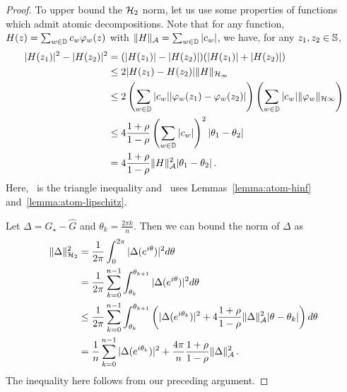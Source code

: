 \begin{proof}
To upper bound the $\mathcal{H}_2$ norm, let us use some properties of functions which admit atomic decompositions.  Note that for any function, $H(z) = \sum_{w \in \mathbb{D}} c_w \varphi_w(z)$ with $\|H\|_{\mathcal{A}}=\sum_{w\in\mathbb{D}} |c_w|$, we have, for any $z_1,z_2\in\mathbb{S}$,
\begin{subequations}
\begin{align}
\nonumber	|H(z_1)|^2-|H(z_2)|^2 &= 
	(|H(z_1)|-|H(z_2)|)(|H(z_1)|+|H(z_2)|) \\
\nonumber	&\leq 2 |H(z_1)-H(z_2)| \|H\|_{\mathcal{H}_{\infty}} \\
\label{eq:tri-ineq2}	&\leq 2 \left( \sum_{w \in \mathbb{D}} |c_w| |\varphi_w(z_1)-\varphi_w(z_2)|\right) \left(\sum_{w\in \mathbb{D}} |c_w| \|\varphi_w\|_{\mathcal{H}{\infty}}\right)\\
\label{eq:applylemmas}	&\leq 4 \frac{1+\rho}{1-\rho}  \left( \sum_{w \in \mathbb{D}} |c_w|\right)^2 |\theta_1-\theta_2|\\
\nonumber	 &= 4 \frac{1+\rho}{1-\rho}  \|H\|_{\mathcal{A}}^2 |\theta_1-\theta_2|\,.
\end{align}
\end{subequations}
Here,~ is the triangle inequality and~ uses Lemmas~\ref{lemma:atom-hinf} and~\ref{lemma:atom-lipschitz}.

Let $\Delta = G_\star-\hat{G}$ and $\theta_k= \frac{2 \pi k}{n}$.  Then we can bound the norm of $\Delta$ as
\begin{align*}
\|\Delta\|_{\mathcal{H}_2}^2 &= \frac{1}{2\pi} \int_0^{2\pi} |\Delta(e^{i\theta})|^2 d\theta\\
&= \frac{1}{2\pi} \sum_{k=0}^{n-1} \int_{\theta_k}^{\theta_{k+1}} |\Delta(e^{i\theta})|^2 d\theta\\
&\leq \frac{1}{2\pi} \sum_{k=0}^{n-1} \int_{\theta_k}^{\theta_{k+1}} \left(|\Delta(e^{i\theta_k})|^2 + 4 \frac{1+\rho}{1-\rho} \|\Delta\|_{\mathcal{A}}^2 |\theta-\theta_k| \right)d\theta\\
&= \frac{1}{n}\sum_{k=0}^{n-1} |\Delta(e^{i\theta_k})|^2 + \frac{4\pi}{n} \frac{1+\rho}{1-\rho} \|\Delta\|_{\mathcal{A}}^2\,.
\end{align*}
The inequality here follows from our preceding argument. 


\end{proof}
